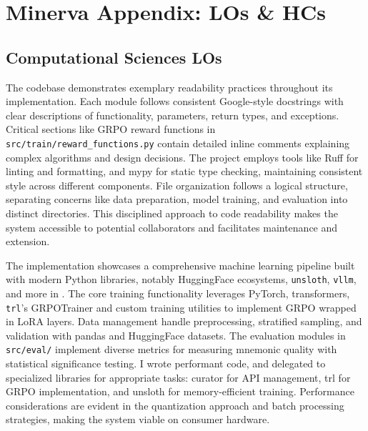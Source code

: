 \section{Minerva Appendix: LOs \& HCs} \label{sec:minerva}

\subsection{Computational Sciences LOs} \label{sec:los}

 The codebase demonstrates exemplary readability practices throughout its implementation. Each module follows consistent Google-style docstrings with clear descriptions of functionality, parameters, return types, and exceptions. Critical sections like GRPO reward functions in \verb|src/train/reward_functions.py| contain detailed inline comments explaining complex algorithms and design decisions. The project employs tools like Ruff for linting and formatting, and mypy for static type checking, maintaining consistent style across different components. File organization follows a logical structure, separating concerns like data preparation, model training, and evaluation into distinct directories. This disciplined approach to code readability makes the system accessible to potential collaborators and facilitates maintenance and extension.

 The implementation showcases a comprehensive machine learning pipeline built with modern Python libraries, notably HuggingFace ecosystems, \verb|unsloth|, \verb|vllm|, and more in . The core training functionality leverages PyTorch, transformers, \verb|trl|'s GRPOTrainer and custom training utilities to implement GRPO wrapped in LoRA layers. Data management handle preprocessing, stratified sampling, and validation with pandas and HuggingFace datasets. The evaluation modules in \verb|src/eval/| implement diverse metrics for measuring mnemonic quality with statistical significance testing. I wrote performant code, and delegated to specialized libraries for appropriate tasks: curator for API management, trl for GRPO implementation, and unsloth for memory-efficient training. Performance considerations are evident in the quantization approach and batch processing strategies, making the system viable on consumer hardware.

